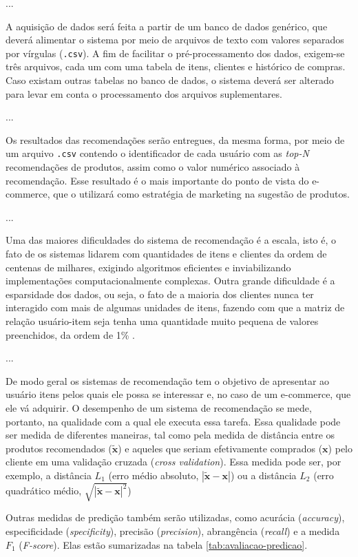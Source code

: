 ...

A aquisição de dados será feita a partir de um banco de dados genérico, que deverá alimentar o sistema por meio de arquivos de texto com valores separados por vírgulas (\texttt{.csv}). A fim de facilitar o pré-processamento dos dados, exigem-se três arquivos, cada um com uma tabela de itens, clientes e histórico de compras. Caso existam outras tabelas no banco de dados, o sistema deverá ser alterado para levar em conta o processamento dos arquivos suplementares.

...

Os resultados das recomendações serão entregues, da mesma forma, por meio de um arquivo \texttt{.csv} contendo o identificador de cada usuário com as \textit{top-N} recomendações de produtos, assim como o valor numérico associado à recomendação. Esse resultado é o mais importante do ponto de vista do e-commerce, que o utilizará como estratégia de marketing na sugestão de produtos.

...

Uma das maiores dificuldades do sistema de recomendação é a escala, isto é, o fato de os sistemas lidarem com quantidades de itens e clientes da ordem de centenas de milhares, exigindo algoritmos eficientes e inviabilizando implementações computacionalmente complexas. Outra grande dificuldade é a esparsidade dos dados, ou seja, o fato de a maioria dos clientes nunca ter interagido com mais de algumas unidades de itens, fazendo com que a matriz de relação usuário-item seja tenha uma quantidade muito pequena de valores preenchidos, da ordem de 1\% \cite{fennell2009collaborative}.

...

De modo geral os sistemas de recomendação tem o objetivo de apresentar ao usuário itens pelos quais ele possa se interessar e, no caso de um e-commerce, que ele vá adquirir. O desempenho de um sistema de recomendação se mede, portanto, na qualidade com a qual ele executa essa tarefa. Essa qualidade pode ser medida de diferentes maneiras, tal como pela medida de distância entre os produtos recomendados ($\widetilde{\mathbf{x}}$) e aqueles que seriam efetivamente comprados ($\mathbf{x}$) pelo cliente em uma validação cruzada (\textit{cross validation}). Essa medida pode ser, por exemplo, a distância $L_1$ (erro médio absoluto, $\left|\widetilde{\mathbf{x}} - \mathbf{x}\right|$) ou a distância $L_2$ (erro quadrático médio,  $\sqrt{\left|\widetilde{\mathbf{x}} - \mathbf{x}\right|^2}$)

Outras medidas de predição também serão utilizadas, como acurácia (\textit{accuracy}), especificidade (\textit{specificity}), precisão (\textit{precision}), abrangência (\textit{recall}) e a medida $F_1$ (\textit{F-score}). Elas estão sumarizadas na tabela \ref{tab:avaliacao-predicao}.

